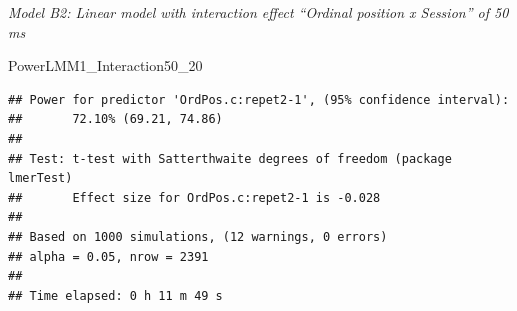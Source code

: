\documentclass[
]{article}
\newenvironment{Shaded}{\begin{snugshade}}{\end{snugshade}}
\newcommand{\AttributeTok}[1]{\textcolor[rgb]{0.77,0.63,0.00}{#1}}
\newcommand{\CommentTok}[1]{\textcolor[rgb]{0.56,0.35,0.01}{\textit{#1}}}
\newcommand{\DecValTok}[1]{\textcolor[rgb]{0.00,0.00,0.81}{#1}}
\newcommand{\FunctionTok}[1]{\textcolor[rgb]{0.00,0.00,0.00}{#1}}
\newcommand{\NormalTok}[1]{#1}
\newcommand{\OtherTok}[1]{\textcolor[rgb]{0.56,0.35,0.01}{#1}}
\newcommand{\SpecialCharTok}[1]{\textcolor[rgb]{0.00,0.00,0.00}{#1}}
\newcommand{\StringTok}[1]{\textcolor[rgb]{0.31,0.60,0.02}{#1}}
\begin{document}
\begin{Shaded}
\end{Shaded}

\emph{Model B2: Linear model with interaction effect ``Ordinal position
x Session'' of 50 ms}

\begin{Shaded}
\end{Shaded}

\begin{Shaded}
\begin{Highlighting}[]
\NormalTok{PowerLMM1\_Interaction50\_20}
\end{Highlighting}
\end{Shaded}

\begin{verbatim}
## Power for predictor 'OrdPos.c:repet2-1', (95% confidence interval):
##       72.10% (69.21, 74.86)
## 
## Test: t-test with Satterthwaite degrees of freedom (package lmerTest)
##       Effect size for OrdPos.c:repet2-1 is -0.028
## 
## Based on 1000 simulations, (12 warnings, 0 errors)
## alpha = 0.05, nrow = 2391
## 
## Time elapsed: 0 h 11 m 49 s
\end{verbatim}
\end{document}
